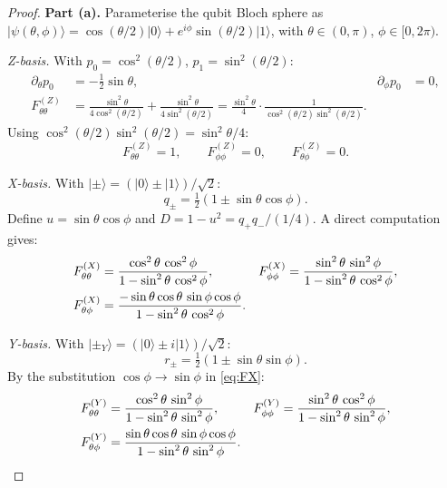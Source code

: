 \documentclass[12pt,a4paper]{article}
\theoremstyle{definition}
\newcommand{\ket}[1]{| #1 \rangle}
\begin{document}
\begin{proof}
\textbf{Part (a).}
Parameterise the qubit Bloch sphere as
$\ket{\psi(\theta,\phi)} = \cos(\theta/2)\ket{0}
+ e^{i\phi}\sin(\theta/2)\ket{1}$, with $\theta \in (0,\pi)$,
$\phi \in [0, 2\pi)$.

\medskip\noindent
\textit{Z-basis.} With $p_0 = \cos^2(\theta/2)$,
$p_1 = \sin^2(\theta/2)$:
\begin{align}
  \partial_\theta p_0 &= -\tfrac{1}{2}\sin\theta,
  &\partial_\phi p_0 &= 0, \\
  F^{(Z)}_{\theta\theta}
  &= \frac{\sin^2\theta}{4\cos^2(\theta/2)}
     + \frac{\sin^2\theta}{4\sin^2(\theta/2)}
  = \frac{\sin^2\theta}{4} \cdot
    \frac{1}{\cos^2(\theta/2)\sin^2(\theta/2)}.
\end{align}
Using $\cos^2(\theta/2)\sin^2(\theta/2) = \sin^2\theta / 4$:
\begin{equation}
  F^{(Z)}_{\theta\theta} = 1, \qquad
  F^{(Z)}_{\phi\phi} = 0, \qquad
  F^{(Z)}_{\theta\phi} = 0.
\end{equation}

\medskip\noindent
\textit{X-basis.} With $\ket{\pm} = (\ket{0} \pm \ket{1})/\sqrt{2}$:
\begin{equation}
  q_\pm = \tfrac{1}{2}(1 \pm \sin\theta\cos\phi).
\end{equation}
Define $u = \sin\theta\cos\phi$ and $D = 1 - u^2 = q_+ q_- / (1/4)$.
A direct computation gives:
\begin{align}
  F^{(X)}_{\theta\theta}
  &= \frac{\cos^2\theta\,\cos^2\phi}{1 - \sin^2\theta\,\cos^2\phi},
  &F^{(X)}_{\phi\phi}
  &= \frac{\sin^2\theta\,\sin^2\phi}{1 - \sin^2\theta\,\cos^2\phi},
  \label{eq:FX}
  \\
  F^{(X)}_{\theta\phi}
  &= \frac{-\sin\theta\cos\theta\,\sin\phi\cos\phi}
          {1 - \sin^2\theta\,\cos^2\phi}.
  \notag
\end{align}

\medskip\noindent
\textit{Y-basis.} With
$\ket{\pm_Y} = (\ket{0} \pm i\ket{1})/\sqrt{2}$:
\begin{equation}
  r_\pm = \tfrac{1}{2}(1 \pm \sin\theta\sin\phi).
\end{equation}
By the substitution $\cos\phi \to \sin\phi$ in \eqref{eq:FX}:
\begin{align}
  F^{(Y)}_{\theta\theta}
  &= \frac{\cos^2\theta\,\sin^2\phi}{1 - \sin^2\theta\,\sin^2\phi},
  &F^{(Y)}_{\phi\phi}
  &= \frac{\sin^2\theta\,\cos^2\phi}{1 - \sin^2\theta\,\sin^2\phi},
  \\
  F^{(Y)}_{\theta\phi}
  &= \frac{\sin\theta\cos\theta\,\sin\phi\cos\phi}
          {1 - \sin^2\theta\,\sin^2\phi}.
  \notag
\end{align}


\end{proof}
\end{document}
